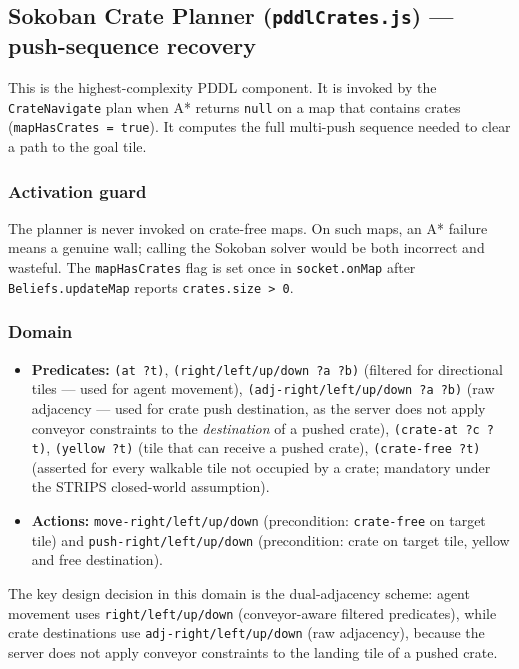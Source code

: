 \documentclass[10pt,a4paper,twocolumn]{article}
\begin{document}
\subsection{Sokoban Crate Planner (\texttt{pddlCrates.js}) — push-sequence recovery}

This is the highest-complexity PDDL component.  It is invoked by the
\texttt{CrateNavigate} plan when A* returns \texttt{null} on a map that contains
crates (\texttt{mapHasCrates = true}).  It computes the full multi-push sequence
needed to clear a path to the goal tile.

\subsubsection*{Activation guard}
The planner is never invoked on crate-free maps.  On such maps, an A* failure
means a genuine wall; calling the Sokoban solver would be both incorrect and
wasteful.  The \texttt{mapHasCrates} flag is set once in
\texttt{socket.onMap} after \texttt{Beliefs.updateMap} reports
\texttt{crates.size > 0}.

\subsubsection*{Domain}
\begin{itemize}[noitemsep]
  \item \textbf{Predicates:} \texttt{(at ?t)}, \texttt{(right/left/up/down ?a ?b)}
        (filtered for directional tiles — used for agent movement),
        \texttt{(adj-right/left/up/down ?a ?b)} (raw adjacency — used for crate
        push destination, as the server does not apply conveyor constraints to the
        \emph{destination} of a pushed crate), \texttt{(crate-at ?c ?t)},
        \texttt{(yellow ?t)} (tile that can receive a pushed crate),
        \texttt{(crate-free ?t)} (asserted for every walkable tile not occupied by
        a crate; mandatory under the STRIPS closed-world assumption).
  \item \textbf{Actions:} \texttt{move-right/left/up/down} (precondition:
        \texttt{crate-free} on target tile) and \texttt{push-right/left/up/down}
        (precondition: crate on target tile, yellow and free destination).
\end{itemize}

\noindent The key design decision in this domain is the dual-adjacency scheme:
agent movement uses \texttt{right/left/up/down} (conveyor-aware filtered
predicates), while crate destinations use \texttt{adj-right/left/up/down}
(raw adjacency), because the server does not apply conveyor constraints to
the landing tile of a pushed crate.
\end{document}
